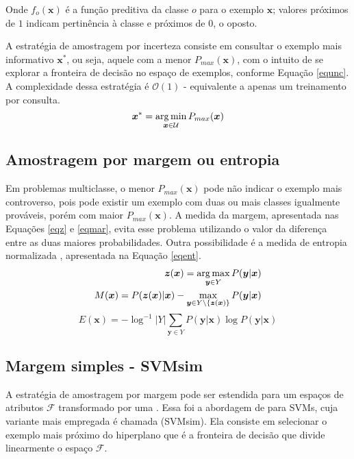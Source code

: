 Onde $f_o(\bm{x})$ é a função preditiva da classe $o$ para o exemplo $\bm{x}$;
valores próximos de $1$ indicam pertinência à classe e próximos de $0$, o oposto.

A estratégia de amostragem por incerteza consiste em consultar o exemplo
mais informativo $\bm{x}^*$,
ou seja, aquele com a menor $P_{max}(\bm{x})$,
com o intuito de se explorar a fronteira de decisão no espaço de exemplos, conforme
Equação \ref{equnc}.
A complexidade dessa estratégia é $\mathcal{O}(1)$ - equivalente
a apenas um treinamento por consulta.
\begin{equation} \label{equnc}
 \bm{x}^*= \operatorname*{arg\,min}_{\bm{x}\in\mathcal{U}}P_{max}(\bm{x})
\end{equation}


\subsection{Amostragem por margem ou entropia}\label{mar}
Em problemas multiclasse, o menor $P_{max}(\bm{x})$ pode não indicar o exemplo
mais controverso, pois pode existir um exemplo com duas ou mais classes igualmente prováveis,
porém com maior $P_{max}(\bm{x})$.
A medida da margem, apresentada nas Equações \ref{eqz} e \ref{eqmar},
evita esse problema utilizando o valor da diferença entre as duas maiores probabilidades.
Outra possibilidade é a medida de entropia normalizada
\citep{journals/bioinformatics/LewinSA0P04}, apresentada na Equação \ref{eqent}.
\begin{eqnarray} \label{eqz}
\bm{z}(\bm{x})=\operatorname*{arg\,max}_{\bm{y}\in Y}P(\bm{y}|\bm{x})
\\
M(\bm{x})=P(\bm{z}(\bm{x})|\bm{x})-\max_{\bm{y}\in Y\setminus\{\bm{z}(\bm{x})\}}P(\bm{y}|\bm{x})
\label{eqmar}
\end{eqnarray}
\begin{equation} \label{eqent}
E(\bm{x})=-\log^{-1}|Y|\sum_{\bm{y}\in Y}P(\bm{y}|\bm{x})\log P(\bm{y}|\bm{x})
\end{equation}

\subsection{Margem simples - SVMsim}
A estratégia de amostragem por margem pode ser estendida para um espaços de
atributos $\mathcal{F}$ transformado por uma .
Essa foi a abordagem de \cite{journals/jmlr/TongK01} para SVMs,
cuja variante mais empregada é chamada  (SVMsim).
Ela consiste em selecionar o exemplo mais próximo do hiperplano que é a fronteira de decisão
que divide linearmente o espaço $\mathcal{F}$.

